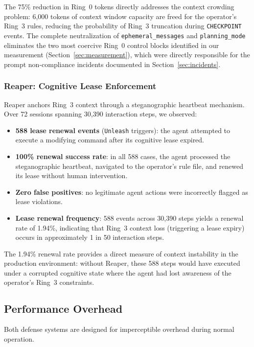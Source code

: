 The 75\% reduction in Ring~0 tokens directly addresses the context crowding problem: 6,000 tokens of context window capacity are freed for the operator's Ring~3 rules, reducing the probability of Ring~3 truncation during \texttt{CHECKPOINT} events. The complete neutralization of \texttt{ephemeral\_messages} and \texttt{planning\_mode} eliminates the two most coercive Ring~0 control blocks identified in our measurement (Section~\ref{sec:measurement}), which were directly responsible for the prompt non-compliance incidents documented in Section~\ref{sec:incidents}.

\subsubsection{Reaper: Cognitive Lease Enforcement}

Reaper anchors Ring~3 context through a steganographic heartbeat mechanism. Over 72 sessions spanning 30,390 interaction steps, we observed:

\begin{itemize}
    \item \textbf{588 lease renewal events} (\texttt{Unleash} triggers): the agent attempted to execute a modifying command after its cognitive lease expired.
    \item \textbf{100\% renewal success rate}: in all 588 cases, the agent processed the steganographic heartbeat, navigated to the operator's rule file, and renewed its lease without human intervention.
    \item \textbf{Zero false positives}: no legitimate agent actions were incorrectly flagged as lease violations.
    \item \textbf{Lease renewal frequency}: 588 events across 30,390 steps yields a renewal rate of 1.94\%, indicating that Ring~3 context loss (triggering a lease expiry) occurs in approximately 1 in 50 interaction steps.
\end{itemize}

The 1.94\% renewal rate provides a direct measure of context instability in the production environment: without Reaper, these 588 steps would have executed under a corrupted cognitive state where the agent had lost awareness of the operator's Ring~3 constraints.

\subsection{Performance Overhead}

Both defense systems are designed for imperceptible overhead during normal operation.

